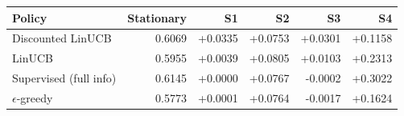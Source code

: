 \begin{tabular}{lrrrrr}
\toprule
Policy & Stationary & S1 & S2 & S3 & S4 \\
\midrule
Discounted LinUCB & 0.6069 & +0.0335 & +0.0753 & +0.0301 & +0.1158 \\
LinUCB & 0.5955 & +0.0039 & +0.0805 & +0.0103 & +0.2313 \\
Supervised (full info) & 0.6145 & +0.0000 & +0.0767 & -0.0002 & +0.3022 \\
$\epsilon$-greedy & 0.5773 & +0.0001 & +0.0764 & -0.0017 & +0.1624 \\
\bottomrule
\end{tabular}